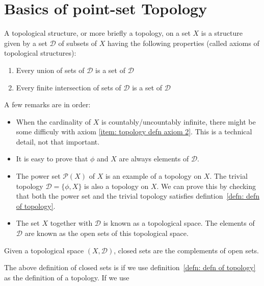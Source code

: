     \section{Basics of point-set Topology}
      \begin{definition}[Topology]
        \label{defn: defn of topology}
        A topological structure, or more briefly a topology, on a set $X$ is
        a structure given by a set $\mathcal{D}$ of subsets of $X$ having the
        following properties (called axioms of topological structures):
        \begin{enumerate}
          \item{Every union of sets of $\mathcal{D}$ is a set of
          $\mathcal{D}$}
          \item{Every finite intersection of sets of $\mathcal{D}$ is a set
          of $\mathcal{D}$ \label{item: topology defn axiom 2}}
        \end{enumerate}
      \end{definition}
      \begin{remark} A few remarks are in order:
        \begin{itemize}
          \item{When the cardinality of $X$ is countably/uncountably
          infinite, there might be some difficuly with axiom \ref{item:
          topology defn axiom 2}. This is a technical detail, not that
          important.}
          \item{It is easy to prove that $\phi$ and $X$ are always elements of
          $\mathcal{D}$.}
          \item{The power set $\mathcal{P}(X)$ of $X$ is an example of a
          topology on $X$. The trivial topology $\mathcal{D} = \{\phi, X\}$
          is also a topology on $X$. We can prove this by checking that both
          the power set and the trivial topology satisfies
          defintion~\ref{defn: defn of topology}.}
          \item{The set $X$ together with $\mathcal{D}$ is known as a
          topological space. The elements of $\mathcal{D}$ are known as the
          open sets of this topological space.}
        \end{itemize}
      \end{remark}
    \begin{definition}
      Given a topological space $(X, \mathcal{D})$, closed sets are the
      complements of open sets.
    \end{definition}
    The above definition of closed sets is if we use definition~\ref{defn:
    defn of topology} as the definition of a topology. If we use
